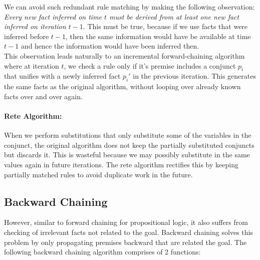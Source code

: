 \documentclass[12pt]{article}
\begin{document}
We can avoid such redundant rule matching by making the following observation: \textit{Every new fact inferred on time $t$ must be derived from at least one new fact inferred on iteration $t-1$}. This must be true, because if we use facts that were inferred before $t-1$, then the same information would have be available at time $t-1$ and hence the information would have been inferred then.\\

This observation leads naturally to an incremental forward-chaining algorithm where at iteration $t$, we check a rule only if it's premise includes a conjunct $p_i$ that unifies with a newly inferred fact $p_i'$ in the previous iteration. This generates the same facts as the original algorithm, without looping over already known facts over and over again.\\

\paragraph{Rete Algorithm:}

When we perform substitutions that only substitute some of the variables in the conjunct, the original algorithm does not keep the partially substituted conjuncts but discards it. This is wasteful because we may possibly substitute in the same values again in future iterations. The rete algorithm rectifies this by keeping partially matched rules to avoid duplicate work in the future.

\pagebreak
\subsection{Backward Chaining}

However, similar to forward chaining for propositional logic, it also suffers from checking of irrelevant facts not related to the goal. Backward chaining solves this problem by only propagating premises backward that are related the goal. The following backward chaining algorithm comprises of 2 functions:
\end{document}
